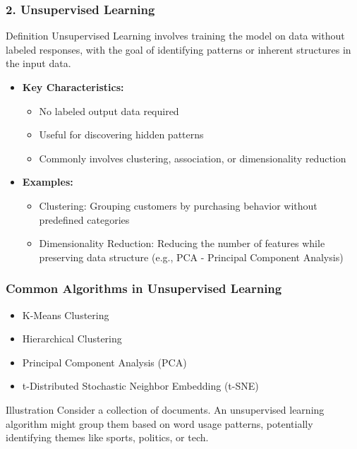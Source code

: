 \documentclass[aspectratio=169]{beamer}
\begin{document}
\begin{frame}[fragile]
    \frametitle{2. Unsupervised Learning}
    \begin{block}{Definition}
        Unsupervised Learning involves training the model on data without labeled responses, with the goal of identifying patterns or inherent structures in the input data.
    \end{block}
    \begin{itemize}
        \item \textbf{Key Characteristics:}
        \begin{itemize}
            \item No labeled output data required
            \item Useful for discovering hidden patterns
            \item Commonly involves clustering, association, or dimensionality reduction
        \end{itemize}
        
        \item \textbf{Examples:}
        \begin{itemize}
            \item Clustering: Grouping customers by purchasing behavior without predefined categories
            \item Dimensionality Reduction: Reducing the number of features while preserving data structure (e.g., PCA - Principal Component Analysis)
        \end{itemize}
    \end{itemize} 
\end{frame}

\begin{frame}[fragile]
    \frametitle{Common Algorithms in Unsupervised Learning}
    \begin{itemize}
        \item K-Means Clustering
        \item Hierarchical Clustering
        \item Principal Component Analysis (PCA)
        \item t-Distributed Stochastic Neighbor Embedding (t-SNE)
    \end{itemize}

    \begin{block}{Illustration}
        Consider a collection of documents. An unsupervised learning algorithm might group them based on word usage patterns, potentially identifying themes like sports, politics, or tech.
    \end{block}
\end{frame}
\end{document}
